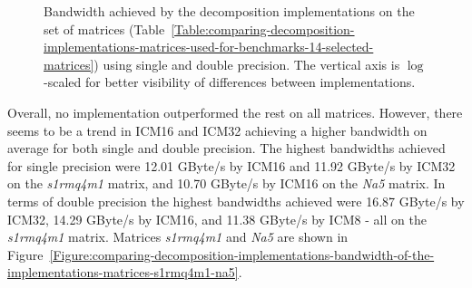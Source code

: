 \begin{figure}[ht!]
\begin{subfigure}{\textwidth}
	\end{subfigure}
	\caption{Bandwidth achieved by the decomposition implementations on the set of matrices (Table~\ref{Table:comparing-decomposition-implementations-matrices-used-for-benchmarks-14-selected-matrices}) using single and double precision. The vertical axis is $ \log $-scaled for better visibility of differences between implementations.}
	\label{Graph:comparing-decomposition-implementations-bandwidth-of-the-implementations-single-double-precision}
\end{figure}

Overall, no implementation outperformed the rest on all matrices. However, there seems to be a trend in ICM16 and ICM32 achieving a higher bandwidth on average for both single and double precision. The highest bandwidths achieved for single precision were 12.01 GByte/s by ICM16 and 11.92 GByte/s by ICM32 on the \textit{s1rmq4m1} matrix, and 10.70 GByte/s by ICM16 on the \textit{Na5} matrix. In terms of double precision the highest bandwidths achieved were 16.87 GByte/s by ICM32, 14.29 GByte/s by ICM16, and 11.38 GByte/s by ICM8 - all on the \textit{s1rmq4m1} matrix. Matrices \textit{s1rmq4m1} and \textit{Na5} are shown in Figure~\ref{Figure:comparing-decomposition-implementations-bandwidth-of-the-implementations-matrices-s1rmq4m1-na5}.

